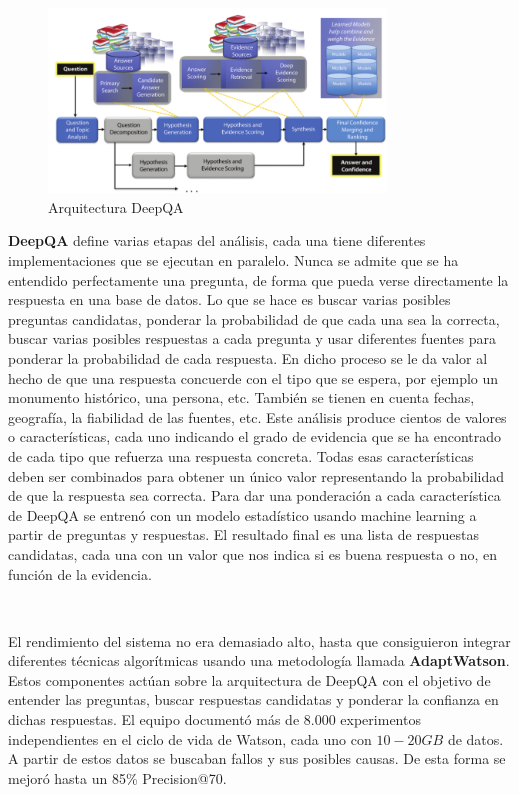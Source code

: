 \documentclass[paper=a4, fontsize=10pt]{scrartcl} %
\numberwithin{equation}{section} %
\numberwithin{figure}{section} %
\numberwithin{table}{section} %
\begin{document}
\begin{figure}[H]
	\centering
	\label{tiw-deepqa}
	\includegraphics[width=0.8\textwidth]{./Imagenes/deepQA.png}
	\caption{Arquitectura DeepQA}
\end{figure}

\textbf{DeepQA} define varias etapas del análisis, cada una tiene diferentes implementaciones que se ejecutan en paralelo.  
Nunca se admite que se ha entendido perfectamente una pregunta, de forma que pueda verse directamente la respuesta en una base de datos.
Lo que se hace es buscar varias posibles preguntas candidatas, ponderar la probabilidad de que cada una sea la correcta, buscar varias posibles respuestas a cada pregunta y usar diferentes fuentes para ponderar la probabilidad de cada respuesta.
En dicho proceso se le da valor al hecho de que una respuesta concuerde con el tipo que se espera, por ejemplo un monumento histórico, una persona, etc.
También se tienen en cuenta fechas, geografía, la fiabilidad de las fuentes, etc.
Este análisis produce cientos de valores o características, cada uno indicando el grado de evidencia que se ha encontrado de cada tipo que refuerza una respuesta concreta.
Todas esas características deben ser combinados para obtener un único valor representando la probabilidad de que la respuesta sea correcta.
Para dar una ponderación a cada característica de DeepQA se entrenó con un modelo estadístico usando machine learning a partir de preguntas y respuestas.
El resultado final es una lista de respuestas candidatas, cada una con un valor que nos indica si es buena respuesta o no, en función de la evidencia.

\

El rendimiento del sistema no era demasiado alto, hasta que consiguieron integrar diferentes técnicas algorítmicas usando una metodología llamada \textbf{AdaptWatson}.
Estos componentes actúan sobre la arquitectura de DeepQA con el objetivo de entender las preguntas, buscar respuestas candidatas y ponderar la confianza en dichas respuestas.
El equipo documentó más de $8.000$ experimentos independientes en el ciclo de vida de Watson, cada uno con $10-20GB$ de datos.
A partir de estos datos se buscaban fallos y sus posibles causas.
De esta forma se mejoró hasta un 85\% Precision@70.
\end{document}
